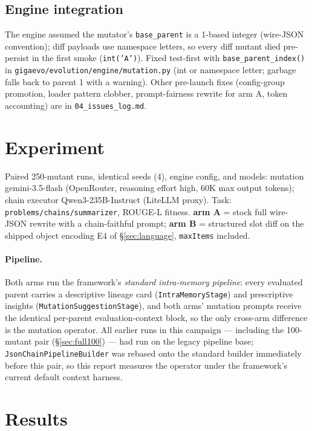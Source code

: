 \documentclass[11pt]{article}
\newcommand{\armA}{\textcolor{bad}{arm A}}
\newcommand{\armB}{\textcolor{accent}{arm B}}
\begin{document}
\subsection{Engine integration}
The engine assumed the mutator's \texttt{base\_parent} is a 1-based integer (wire-JSON
convention); diff payloads use namespace letters, so every diff mutant died pre-persist in
the first smoke (\texttt{int('A')}). Fixed test-first with \texttt{base\_parent\_index()} in
\texttt{gigaevo/evolution/engine/mutation.py} (int or namespace letter; garbage falls back to
parent 1 with a warning). Other pre-launch fixes (config-group promotion, loader pattern
clobber, prompt-fairness rewrite for arm A, token accounting) are in
\texttt{04\_issues\_log.md}.

\section{Experiment}
\label{sec:experiment}
Paired 250-mutant runs, identical seeds (4), engine config, and models: mutation
gemini-3.5-flash (OpenRouter, reasoning effort high, 60K max output tokens); chain executor
Qwen3-235B-Instruct (LiteLLM proxy). Task: \texttt{problems/chains/summarizer}, ROUGE-L
fitness. \textbf{\armA{}} = stock full wire-JSON rewrite with a chain-faithful prompt;
\textbf{\armB{}} = structured slot diff on the shipped object encoding E4 of
\S\ref{sec:language}, \texttt{maxItems} included.

\paragraph{Pipeline.} Both arms run the framework's \emph{standard intra-memory pipeline}:
every evaluated parent carries a descriptive lineage card (\texttt{IntraMemoryStage}) and
prescriptive insights (\texttt{MutationSuggestionStage}), and both arms' mutation prompts
receive the identical per-parent evaluation-context block, so the only cross-arm difference
is the mutation operator. All earlier runs in this campaign --- including the 100-mutant
pair (\S\ref{sec:full100}) --- had run on the legacy pipeline base;
\texttt{JsonChainPipelineBuilder} was rebased onto the standard builder immediately before
this pair, so this report measures the operator under the framework's current default
context harness.

\section{Results}
\end{document}
